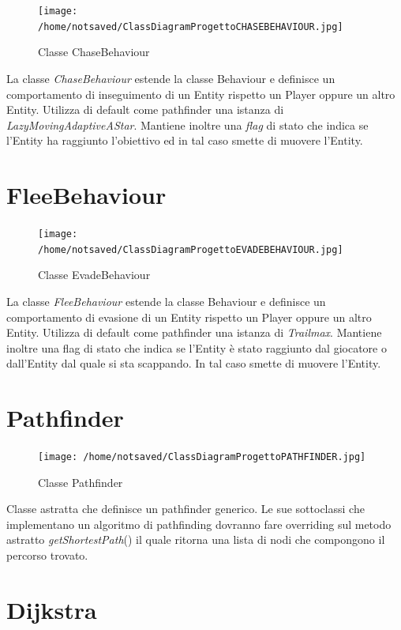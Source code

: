 \documentclass[11pt]{book}
\begin{document}
\begin{figure}[H]
\centering
\texttt{[image: /home/notsaved/ClassDiagramProgettoCHASEBEHAVIOUR.jpg]}
\caption{Classe ChaseBehaviour}
\label{classchase}
\end{figure}

La classe \emph{ChaseBehaviour} estende la classe Behaviour e definisce un comportamento di inseguimento di un Entity rispetto un Player oppure un altro Entity. Utilizza di default come pathfinder una istanza di \emph{LazyMovingAdaptiveAStar}. Mantiene inoltre una \emph{flag} di stato che indica se l'Entity ha raggiunto l'obiettivo ed in tal caso smette di muovere l'Entity.

\section{FleeBehaviour}

\begin{figure}[htp]
\centering
\texttt{[image: /home/notsaved/ClassDiagramProgettoEVADEBEHAVIOUR.jpg]}
\caption{Classe EvadeBehaviour}
\label{classevade}
\end{figure}

La classe \emph{FleeBehaviour} estende la classe Behaviour e definisce un comportamento di evasione di un Entity rispetto un Player oppure un altro Entity. Utilizza di default come pathfinder una istanza di \emph{Trailmax}. Mantiene inoltre una flag di stato che indica se l'Entity \`e stato raggiunto dal giocatore o dall'Entity dal quale si sta scappando. In tal caso smette di muovere l'Entity.

\section{Pathfinder}

\begin{figure}[H]
\centering
\texttt{[image: /home/notsaved/ClassDiagramProgettoPATHFINDER.jpg]}
\caption{Classe Pathfinder}
\label{classpathfind}
\end{figure}

Classe astratta che definisce un pathfinder generico. Le sue sottoclassi che implementano un algoritmo di pathfinding dovranno fare overriding sul metodo astratto \emph{getShortestPath}() il quale ritorna una lista di nodi che compongono il percorso trovato.

\section{Dijkstra}
\end{document}

